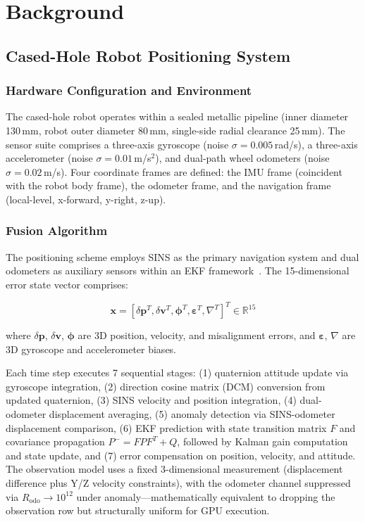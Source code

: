\documentclass[pdflatex,sn-mathphys-num]{sn-jnl}%
\theoremstyle{thmstyleone}%
\theoremstyle{thmstyletwo}%
\theoremstyle{thmstylethree}%
\begin{document}
\section{Background}\label{sec2}

\subsection{Cased-Hole Robot Positioning System}\label{subsec:system}

\subsubsection{Hardware Configuration and Environment}

The cased-hole robot operates within a sealed metallic pipeline (inner diameter 130\,mm, robot outer diameter 80\,mm, single-side radial clearance 25\,mm). The sensor suite comprises a three-axis gyroscope (noise $\sigma = 0.005$\,rad/s), a three-axis accelerometer (noise $\sigma = 0.01$\,m/s$^2$), and dual-path wheel odometers (noise $\sigma = 0.02$\,m/s). Four coordinate frames are defined: the IMU frame (coincident with the robot body frame), the odometer frame, and the navigation frame (local-level, x-forward, y-right, z-up).

\subsubsection{Fusion Algorithm}

The positioning scheme employs SINS as the primary navigation system and dual odometers as auxiliary sensors within an EKF framework~\cite{bib3}. The 15-dimensional error state vector comprises:

\begin{equation}
\mathbf{x} = [\delta\mathbf{p}^T, \delta\mathbf{v}^T, \boldsymbol{\phi}^T, \boldsymbol{\varepsilon}^T, \nabla^T]^T \in \mathbb{R}^{15}
\label{eq:state}
\end{equation}

where $\delta\mathbf{p}$, $\delta\mathbf{v}$, $\boldsymbol{\phi}$ are 3D position, velocity, and misalignment errors, and $\boldsymbol{\varepsilon}$, $\nabla$ are 3D gyroscope and accelerometer biases.

Each time step executes 7 sequential stages: (1) quaternion attitude update via gyroscope integration, (2) direction cosine matrix (DCM) conversion from updated quaternion, (3) SINS velocity and position integration, (4) dual-odometer displacement averaging, (5) anomaly detection via SINS-odometer displacement comparison, (6) EKF prediction with state transition matrix $F$ and covariance propagation $P^- = FPF^T + Q$, followed by Kalman gain computation and state update, and (7) error compensation on position, velocity, and attitude. The observation model uses a fixed 3-dimensional measurement (displacement difference plus Y/Z velocity constraints), with the odometer channel suppressed via $R_{\text{odo}} \rightarrow 10^{12}$ under anomaly---mathematically equivalent to dropping the observation row but structurally uniform for GPU execution.
\end{document}
